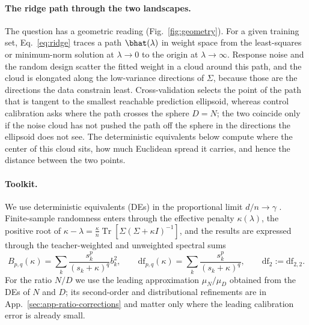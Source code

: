 \paragraph{The ridge path through the two landscapes.}
The question has a geometric reading (Fig.~\ref{fig:geometry}). For a given training set, Eq.~\ref{eq:ridge} traces a path $\bhat(\lambda)$ in weight space from the least-squares or minimum-norm solution at $\lambda\to0$ to the origin at $\lambda\to\infty$. Response noise and the random design scatter the fitted weight in a cloud around this path, and the cloud is elongated along the low-variance directions of $\Sigma$, because those are the directions the data constrain least. Cross-validation selects the point of the path that is tangent to the smallest reachable prediction ellipsoid, whereas control calibration asks where the path crosses the sphere $D=N$; the two coincide only if the noise cloud has not pushed the path off the sphere in the directions the ellipsoid does not see. The deterministic equivalents below compute where the center of this cloud sits, how much Euclidean spread it carries, and hence the distance between the two points.


\paragraph{Toolkit.}
We use deterministic equivalents (DEs) in the proportional limit $d/n\to\gamma$ \citep{dobriban2018high,hastie2022surprises}. Finite-sample randomness enters through the effective penalty $\kappa(\lambda)$, the positive root of $\kappa-\lambda=\frac{\kappa}{n}\operatorname{Tr}[\Sigma(\Sigma+\kappa I)^{-1}]$, and the results are expressed through the teacher-weighted and unweighted spectral sums
\begin{equation}
B_{p,q}(\kappa)=\sum_k\frac{s_k^p}{(s_k+\kappa)^q}b_k^2,\qquad
\mathrm{df}_{p,q}(\kappa)=\sum_k\frac{s_k^p}{(s_k+\kappa)^q},\qquad \mathrm{df}_2:=\mathrm{df}_{2,2}.
\end{equation}
For the ratio $N/D$ we use the leading approximation $\mu_N/\mu_D$ obtained from the DEs of $N$ and $D$; its second-order and distributional refinements are in App.~\ref{sec:app-ratio-corrections} and matter only where the leading calibration error is already small.

